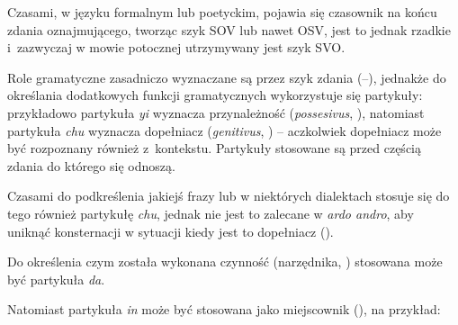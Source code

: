 \begin{spacing}{1.1}
Czasami, w języku formalnym lub poetyckim, pojawia się czasownik na końcu zdania
oznajmującego, tworząc szyk SOV lub nawet OSV, jest to jednak rzadkie
i~zazwyczaj w mowie potocznej utrzymywany jest szyk SVO.



Role gramatyczne zasadniczo wyznaczane są przez szyk zdania (\Nom{}--\Acc{}),
jednakże do określania dodatkowych funkcji gramatycznych wykorzystuje się
partykuły: przykładowo partykuła \emph{yi} wyznacza przynależność
(\emph{possesivus}, \Poss{}), natomiast partykuła \emph{chu} wyznacza
dopełniacz (\emph{genitivus}, \Gen{}) -- aczkolwiek dopełniacz może być
rozpoznany również z~kontekstu. Partykuły stosowane są przed częścią zdania do
którego się odnoszą.


Czasami do podkreślenia jakiejś frazy lub w niektórych dialektach stosuje się do
tego również partykułę \emph{chu}, jednak nie jest to zalecane w \emph{ardo
andro}, aby uniknąć konsternacji w sytuacji kiedy jest to dopełniacz
(\Gen{}).





Do określenia czym została wykonana czynność (narzędnika, \Ins{})
stosowana może być partykuła \emph{da}.


Natomiast partykuła \emph{in} może być stosowana jako miejscownik
(\Loc{}), na przykład:


\end{spacing}
